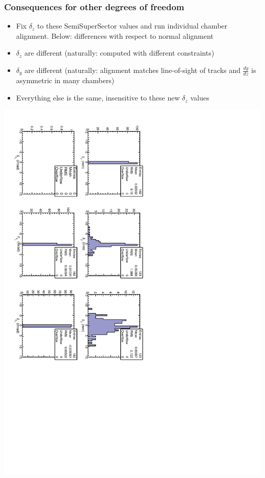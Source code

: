 \documentclass[compress]{beamer}
\begin{document}
\begin{frame}
\frametitle{Consequences for other degrees of freedom}
\begin{itemize}
\item Fix $\delta_z$ to these SemiSuperSector values and run individual chamber alignment.  Below: differences with respect to normal alignment
\item $\delta_z$ are different (naturally: computed with different constraints)
\item $\delta_y$ are different (naturally: alignment matches line-of-sight of tracks and $\frac{dy}{dz}$ is asymmetric in many chambers)
\item Everything else is the same, insensitive to these new $\delta_z$ values
\end{itemize}
\includegraphics[height=0.85\linewidth, angle=90]{zfits_consequence.pdf}
\end{frame}
\end{document}
